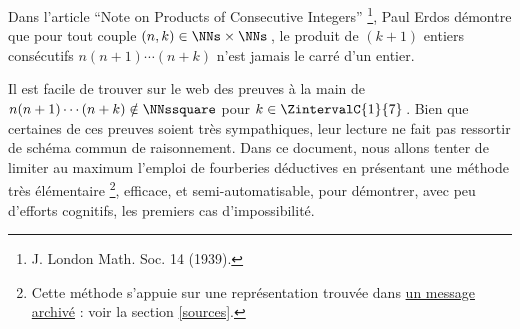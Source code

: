 Dans l'article \enquote{Note on Products of Consecutive Integers}
\footnote{
	J. London Math. Soc. 14 (1939).
},
Paul Erdos démontre que pour tout couple $(n, k) \in \NNs \times \NNs$\,, le produit de $(k+1)$ entiers consécutifs $n (n + 1) \cdots (n + k)$ n'est jamais le carré d'un entier. 

\smallskip

Il est facile de trouver sur le web des preuves à la main de $n(n+1) \cdots (n + k) \notin \NNssquare$ pour $k \in \ZintervalC{1}{7}$\,.
Bien que certaines de ces preuves soient très sympathiques, leur lecture ne fait pas ressortir de schéma commun de raisonnement.
%
Dans ce document, nous allons tenter de limiter au maximum l'emploi de fourberies déductives en présentant une méthode très élémentaire
\footnote{
	Cette méthode s'appuie sur une représentation trouvée dans \href{https://web.archive.org/web/20171110144534/http://mathforum.org/library/drmath/view/65589.html}{un message archivé} : voir la section \ref{sources}.
},
efficace, et semi-automatisable, pour démontrer, avec peu d'efforts cognitifs, les premiers cas d'impossibilité.

